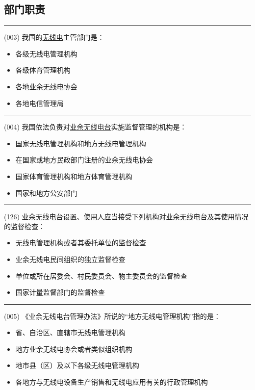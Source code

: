 \documentclass[twocolumn,hyperref,UTF8]{ctexart}  %
\begin{document}
\clearpage
\subsection{部门职责}


\noindent\rule{0.5\textwidth}{1pt}
\heiti (003) 我国的\underline{无线电}{\color{cyan}主管}部门是： \songti {\color{gray} [LK0003] }
\begin{itemize}
	\item  {\color{LimeGreen}各级无线电管理机构}
	\item  各级{\color{red}体育}管理机构
	\item  各地{\color{red}业余}无线电协会
	\item  各地{\color{red}电信}管理局
\end{itemize}


\noindent\rule{0.5\textwidth}{1pt}
\heiti (004) 我国依法负责对\underline{业余无线电台}实施{\color{cyan}监督}管理的机构是： \songti {\color{gray} [LK0004] }
\begin{itemize}
	\item  国家无线电管理机构和地方无线电管理机构
	\item  在国家或地方{\color{red}民政部门注册}的{\color{red}业余无线电协会}
	\item  国家{\color{red}体育}管理机构和地方体育管理机构
	\item  国家和地方{\color{red}公安}部门
\end{itemize}


\noindent\rule{0.5\textwidth}{1pt}
\heiti (126) 业余无线电台设置、使用人应当接受下列机构对业余无线电台及其使用情况的{\color{cyan}监督检查}： \songti {\color{gray} [LK0074] }
\begin{itemize}
	\item  无线电管理机构或者其委托单位的监督检查
	\item  业余无线电民间组织的独立监督检查
	\item  单位或所在居委会、村民委员会、物主委员会的监督检查
	\item  国家计量监督部门的监督检查
\end{itemize}


\noindent\rule{0.5\textwidth}{1pt}
\heiti (005) 《业余无线电台管理办法》所说的“{\color{cyan}地方}无线电管理机构”指的是： \songti {\color{gray} [LK0005] }
\begin{itemize}
	\item  {\color{LimeGreen}省、自治区、直辖市}无线电管理机构
	\item  地方业余无线电协会或者类似组织机构
	\item  地市县（区）及以下各级无线电管理机构
	\item  各地方与无线电设备生产销售和无线电应用有关的行政管理机构
\end{itemize}
\end{document}

